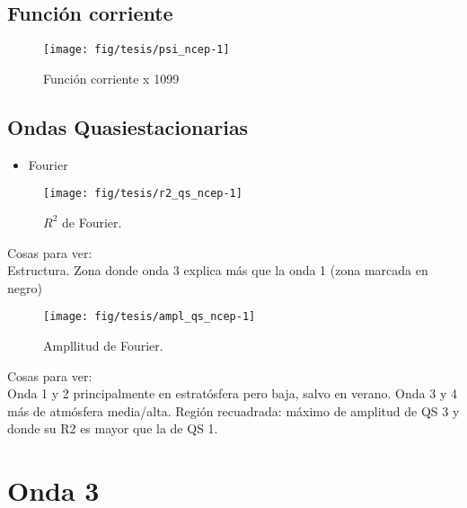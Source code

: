 \documentclass[spanish,a4paper]{book}
\providecommand{\tightlist}{%
  \setlength{\itemsep}{0pt}\setlength{\parskip}{0pt}}
\begin{document}
\section{Función corriente}\label{funcion-corriente}

\begin{figure}

{\centering \texttt{[image: fig/tesis/psi\_ncep-1]} 

}

\caption{Función corriente x 1099}\label{fig:psi_ncep}
\end{figure}

\section{Ondas Quasiestacionarias}\label{ondas-quasiestacionarias}

\begin{itemize}
\tightlist
\item
  Fourier
\end{itemize}

\begin{figure}

{\centering \texttt{[image: fig/tesis/r2\_qs\_ncep-1]} 

}

\caption{$R^2$ de Fourier.}\label{fig:r2_qs_ncep}
\end{figure}

Cosas para ver:\\
Estructura. Zona donde onda 3 explica más que la onda 1 (zona marcada en
negro)

\begin{figure}

{\centering \texttt{[image: fig/tesis/ampl\_qs\_ncep-1]} 

}

\caption{Ampllitud de Fourier.}\label{fig:ampl_qs_ncep}
\end{figure}

Cosas para ver:\\
Onda 1 y 2 principalmente en estratósfera pero baja, salvo en verano.
Onda 3 y 4 más de atmósfera media/alta. Región recuadrada: máximo de
amplitud de QS 3 y donde su R2 es mayor que la de QS 1.

\chapter{Onda 3}\label{onda-3}
\end{document}
